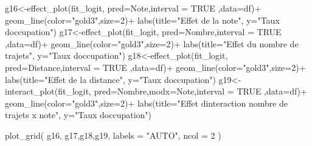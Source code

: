 \documentclass[
]{book}
\newenvironment{Shaded}{\begin{snugshade}}{\end{snugshade}}
\newcommand{\AttributeTok}[1]{\textcolor[rgb]{0.77,0.63,0.00}{#1}}
\newcommand{\ConstantTok}[1]{\textcolor[rgb]{0.00,0.00,0.00}{#1}}
\newcommand{\DecValTok}[1]{\textcolor[rgb]{0.00,0.00,0.81}{#1}}
\newcommand{\FunctionTok}[1]{\textcolor[rgb]{0.00,0.00,0.00}{#1}}
\newcommand{\NormalTok}[1]{#1}
\newcommand{\OtherTok}[1]{\textcolor[rgb]{0.56,0.35,0.01}{#1}}
\newcommand{\SpecialCharTok}[1]{\textcolor[rgb]{0.00,0.00,0.00}{#1}}
\newcommand{\StringTok}[1]{\textcolor[rgb]{0.31,0.60,0.02}{#1}}
\begin{document}
\begin{Shaded}
\begin{Highlighting}[]
\NormalTok{g16}\OtherTok{\textless{}{-}}\FunctionTok{effect\_plot}\NormalTok{(fit\_logit, }\AttributeTok{pred=}\NormalTok{Note,}\AttributeTok{interval =} \ConstantTok{TRUE}\NormalTok{ ,}\AttributeTok{data=}\NormalTok{df)}\SpecialCharTok{+}
  \FunctionTok{geom\_line}\NormalTok{(}\AttributeTok{color=}\StringTok{"gold3"}\NormalTok{,}\AttributeTok{size=}\DecValTok{2}\NormalTok{)}\SpecialCharTok{+}
  \FunctionTok{labs}\NormalTok{(}\AttributeTok{title=}\StringTok{"Effet de la note"}\NormalTok{,}
       \AttributeTok{y=}\StringTok{"Taux d\textquotesingle{}occupation"}\NormalTok{)}
\NormalTok{g17}\OtherTok{\textless{}{-}}\FunctionTok{effect\_plot}\NormalTok{(fit\_logit, }\AttributeTok{pred=}\NormalTok{Nombre,}\AttributeTok{interval =} \ConstantTok{TRUE}\NormalTok{  ,}\AttributeTok{data=}\NormalTok{df)}\SpecialCharTok{+}
  \FunctionTok{geom\_line}\NormalTok{(}\AttributeTok{color=}\StringTok{"gold3"}\NormalTok{,}\AttributeTok{size=}\DecValTok{2}\NormalTok{)}\SpecialCharTok{+}
  \FunctionTok{labs}\NormalTok{(}\AttributeTok{title=}\StringTok{"Effet du nombre de trajets"}\NormalTok{,}
       \AttributeTok{y=}\StringTok{"Taux d\textquotesingle{}occupation"}\NormalTok{)}
\NormalTok{g18}\OtherTok{\textless{}{-}}\FunctionTok{effect\_plot}\NormalTok{(fit\_logit, }\AttributeTok{pred=}\NormalTok{Distance,}\AttributeTok{interval =} \ConstantTok{TRUE}\NormalTok{  ,}\AttributeTok{data=}\NormalTok{df)}\SpecialCharTok{+}
  \FunctionTok{geom\_line}\NormalTok{(}\AttributeTok{color=}\StringTok{"gold3"}\NormalTok{,}\AttributeTok{size=}\DecValTok{2}\NormalTok{)}\SpecialCharTok{+}
  \FunctionTok{labs}\NormalTok{(}\AttributeTok{title=}\StringTok{"Effet de la distance"}\NormalTok{,}
       \AttributeTok{y=}\StringTok{"Taux d\textquotesingle{}occupation"}\NormalTok{)}
\NormalTok{g19}\OtherTok{\textless{}{-}}\FunctionTok{interact\_plot}\NormalTok{(fit\_logit, }\AttributeTok{pred=}\NormalTok{Nombre,}\AttributeTok{modx=}\NormalTok{Note,}\AttributeTok{interval =} \ConstantTok{TRUE}\NormalTok{  ,}\AttributeTok{data=}\NormalTok{df)}\SpecialCharTok{+}
  \FunctionTok{geom\_line}\NormalTok{(}\AttributeTok{color=}\StringTok{"gold3"}\NormalTok{,}\AttributeTok{size=}\DecValTok{2}\NormalTok{)}\SpecialCharTok{+}
  \FunctionTok{labs}\NormalTok{(}\AttributeTok{title=}\StringTok{"Effet d\textquotesingle{}interaction nombre de trajets x note"}\NormalTok{,}
       \AttributeTok{y=}\StringTok{"Taux d\textquotesingle{}occupation"}\NormalTok{)}

\FunctionTok{plot\_grid}\NormalTok{(}
\NormalTok{  g16, g17,g18,g19,}
  \AttributeTok{labels =} \StringTok{"AUTO"}\NormalTok{, }\AttributeTok{ncol =} \DecValTok{2}
\NormalTok{)}
\end{Highlighting}
\end{Shaded}
\end{document}
